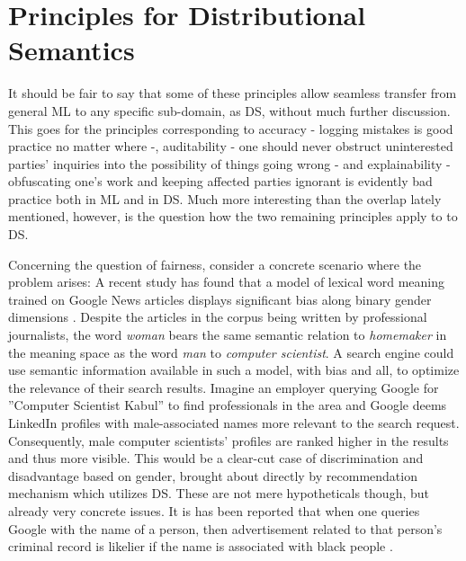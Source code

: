 \documentclass{article}
\begin{document}
\section{Principles for Distributional Semantics}\hypertarget{sec4}{}
It should be fair to say that some of these principles allow seamless transfer from general ML to any specific sub-domain, as DS, without much further discussion.
This goes for the principles corresponding to accuracy - logging mistakes is good practice no matter where -, auditability - one should never obstruct uninterested parties' inquiries into the possibility of things going wrong - and explainability - obfuscating one's work and keeping affected parties ignorant is evidently bad practice both in ML and in DS.
Much more interesting than the overlap lately mentioned, however, is the question how the two remaining principles apply to to DS.

Concerning the question of fairness, consider a concrete scenario where the problem arises: A recent study has found that a model of lexical word meaning trained on Google News articles displays significant bias along binary gender dimensions \cite{bolukbasi2016man}. Despite the articles in the corpus being written by professional journalists, the word \emph{woman} bears the same semantic relation to \emph{homemaker} in the meaning space as the word \emph{man} to \emph{computer scientist}. A search engine could use semantic information available in such a model, with bias and all, to optimize the relevance of their search results. Imagine an employer querying Google for ''Computer Scientist Kabul'' to find professionals in the area and Google deems LinkedIn profiles with male-associated names more relevant to the search request. Consequently, male computer scientists' profiles are ranked higher in the results and thus more visible. This would be a clear-cut case of discrimination and disadvantage based on gender, brought about directly by recommendation mechanism which utilizes DS. These are not mere hypotheticals though, but already very concrete issues. It is has been reported that when one queries Google with the name of a person, then advertisement related to that person's criminal record is likelier if the name is associated with black people \cite{sweeney2013discrimination}.
\end{document}
